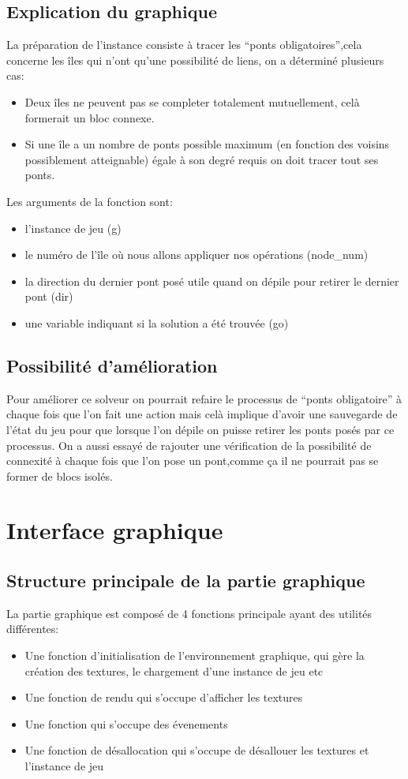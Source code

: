 \documentclass[12pt]{report}
\begin{document}
\section{Explication du graphique}

La préparation de l'instance consiste à tracer les ``ponts obligatoires'',cela concerne les îles qui n'ont qu'une possibilité de liens,
on a déterminé plusieurs cas:
\begin{itemize}
\item Deux îles ne peuvent pas se completer totalement mutuellement, celà formerait un bloc connexe.
\item Si une île a un nombre de ponts possible maximum (en fonction des voisins possiblement atteignable) égale à son degré requis on doit tracer tout ses ponts.
\end{itemize}

Les arguments de la fonction sont:
\begin{itemize}
\item l'instance de jeu (g)
\item le numéro de l'île où nous allons appliquer nos opérations (node\_num)
\item la direction du dernier pont posé utile quand on dépile pour retirer le dernier pont (dir)
\item une variable indiquant si la solution a été trouvée (go)
\end{itemize}

\section{Possibilité d'amélioration}
Pour améliorer ce solveur on pourrait refaire le processus de ``ponts obligatoire'' à chaque fois que l'on fait une action mais celà implique d'avoir une sauvegarde de l'état du jeu pour que lorsque l'on dépile on puisse retirer les ponts posés par ce processus. On a aussi essayé de rajouter une vérification de la possibilité de connexité à chaque fois que l'on pose un pont,comme ça il ne pourrait pas se former de blocs isolés.

\chapter{Interface graphique}
\section{Structure principale de la partie graphique}
La partie graphique est composé de 4 fonctions principale ayant des utilités différentes:
\begin{itemize}
\item Une fonction d'initialisation de l'environnement graphique, qui gère la création des textures, le chargement d'une instance de jeu etc
\item Une fonction de rendu qui s'occupe d'afficher les textures
\item Une fonction qui s'occupe des évenements
\item Une fonction de désallocation qui s'occupe de désallouer les textures et l'instance de jeu
\end{itemize}
\end{document}
